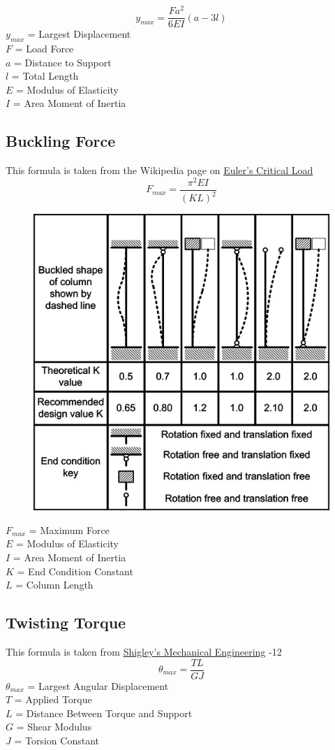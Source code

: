 \documentclass[11pt,a4paper,titlepage]{article}
\begin{document}
	\begin{equation}
		y_{max} = \frac{F a^2}{6 EI} (a-3l)
	\end{equation}
	$y_{max}$ = Largest Displacement \\
	$F$ = Load Force \\
	$a$ = Distance to Support \\
	$l$ = Total Length \\
	$E$ = Modulus of Elasticity \\
	$I$ = Area Moment of Inertia
	
	\subsection{Buckling Force}
	This formula is taken from the Wikipedia page on  \href{https://en.wikipedia.org/wiki/Euler\%27s_critical_load}{Euler's Critical Load}
	\begin{equation}
		F_{max} = \frac{\pi^2 EI}{(KL)^2}
	\end{equation}
	\begin{figure}[H]
		\centering
		\includegraphics[width=0.5\linewidth]{"ColumnEffectiveLength"}
	\end{figure}
	$F_{max}$ = Maximum Force \\
	$E$ = Modulus of Elasticity \\
	$I$ = Area Moment of Inertia \\
	$K$ = End Condition Constant \\
	$L$ = Column Length
	
	\subsection{Twisting Torque}
	This formula is taken from \href{https://fac.ksu.edu.sa/sites/default/files/mechanical-disgin-shigley.pdf}{Shigley's Mechanical Engineering} -12
	\begin{equation}
		\theta_{max} = \frac{T L}{G J}
	\end{equation}
	$\theta_{max}$ = Largest Angular Displacement \\
	$T$ = Applied Torque \\
	$L$ = Distance Between Torque and Support \\
	$G$ = Shear Modulus \\
	$J$ = Torsion Constant
	
\end{document}
